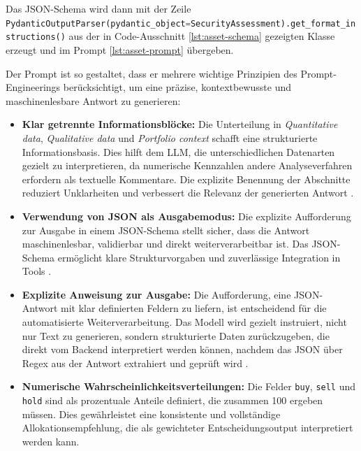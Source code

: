       Das JSON-Schema wird dann mit der Zeile \lstinline[language=Python]$ PydanticOutputParser(pydantic_object=SecurityAssessment).get_format_instructions()$ aus der in Code-Ausschnitt \ref{lst:asset-schema} gezeigten Klasse erzeugt und im Prompt \ref{lst:asset-prompt} übergeben.

      Der Prompt ist so gestaltet, dass er mehrere wichtige Prinzipien des Prompt-Engineerings berücksichtigt, um eine präzise, kontextbewusste und maschinenlesbare Antwort zu generieren:


      \begin{itemize}
        \item \textbf{Klar getrennte Informationsblöcke:} Die Unterteilung in \emph{Quantitative data}, \emph{Qualitative data} und \emph{Portfolio context} schafft eine strukturierte Informationsbasis.
        Dies hilft dem \acs{LLM}, die unterschiedlichen Datenarten gezielt zu interpretieren, da numerische Kennzahlen andere Analyseverfahren erfordern als textuelle Kommentare.
        Die explizite Benennung der Abschnitte reduziert Unklarheiten und verbessert die Relevanz der generierten Antwort \autocite{promtingguide}.

        \item \textbf{Verwendung von \acs{JSON} als Ausgabemodus:} Die explizite Aufforderung zur Ausgabe in einem JSON-Schema stellt sicher, dass die Antwort maschinenlesbar, validierbar und direkt weiterverarbeitbar ist.
        Das JSON-Schema ermöglicht klare Strukturvorgaben und zuverlässige Integration in Tools \autocite{promtingguide}.

        \item \textbf{Explizite Anweisung zur Ausgabe:} Die Aufforderung, eine \acs{JSON}-Antwort mit klar definierten Feldern zu liefern, ist entscheidend für die automatisierte Weiterverarbeitung.
        Das Modell wird gezielt instruiert, nicht nur Text zu generieren, sondern strukturierte Daten zurückzugeben, die direkt vom Backend interpretiert werden können, nachdem das \acs{JSON} über Regex aus der Antwort extrahiert und geprüft wird \autocite{promtingguide}.

        \item \textbf{Numerische Wahrscheinlichkeitsverteilungen:} Die Felder \texttt{buy}, \texttt{sell} und \texttt{hold} sind als prozentuale Anteile definiert, die zusammen 100 ergeben müssen.
        Dies gewährleistet eine konsistente und vollständige Allokationsempfehlung, die als gewichteter Entscheidungsoutput interpretiert werden kann.


\end{itemize}
